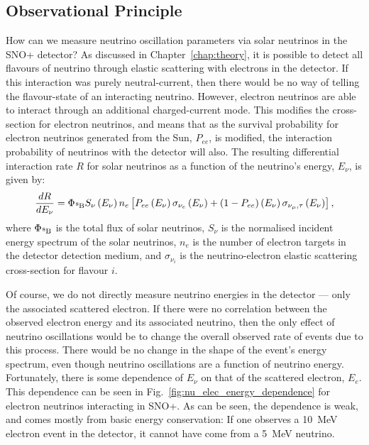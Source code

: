 \subsection{Observational Principle}\label{sec:solar_obs_principle}
How can we measure neutrino oscillation parameters via solar neutrinos in the SNO+ detector? As discussed in Chapter~\ref{chap:theory}, %
it is possible to detect all flavours of neutrino through elastic scattering with electrons in the detector. If this interaction was purely neutral-current, then there would be no way of telling the flavour-state of an interacting neutrino. However, electron neutrinos are able to interact through an additional charged-current mode. This modifies the cross-section for electron neutrinos, and means that as the survival probability for electron neutrinos generated from the Sun, $P_{ee}$, is modified, the interaction probability of neutrinos with the detector will also. The resulting differential interaction rate $R$ for solar neutrinos as a function of the neutrino's energy, $E_{\nu}$, is given by:
\begin{equation}\label{eq:solar_rate}
    \frac{dR}{dE_{\nu}} = 
        \Phi_{\beight{}}S_{\nu}\left(E_{\nu}\right)n_{e}
            \left[
                P_{ee}\left(E_{\nu}\right)\sigma_{\nu_e}\left(E_{\nu}\right) +
                \left(1-P_{ee}\right)\left(E_{\nu}\right)\sigma_{\nu_\mu,\tau}\left(E_{\nu}\right)
            \right],
\end{equation}
where $\Phi_{\beight{}}$ is the total flux of \beight{} solar neutrinos, $S_{\nu}$ is the normalised incident energy spectrum of the solar neutrinos, $n_{e}$ is the number of electron targets in the detector detection medium, and $\sigma_{\nu_{i}}$ is the neutrino-electron elastic scattering cross-section for flavour $i$.

Of course, we do not directly measure neutrino energies in the detector --- only the associated scattered electron. If there were no correlation between the observed electron energy and its associated neutrino, then the only effect of neutrino oscillations would be to change the overall observed rate of events due to this process. There would be no change in the shape of the event's energy spectrum, even though neutrino oscillations are a function of neutrino energy. Fortunately, there is some dependence of $E_{\nu}$ on that of the scattered electron, $E_{e}$. This dependence can be seen in Fig.~\ref{fig:nu_elec_energy_dependence} for \beight{} electron neutrinos interacting in SNO+. %
As can be seen, the dependence is weak, and comes mostly from basic energy conservation: If one observes a \SI{10}{\MeV} electron event in the detector, it cannot have come from a \SI{5}{\MeV} neutrino.

